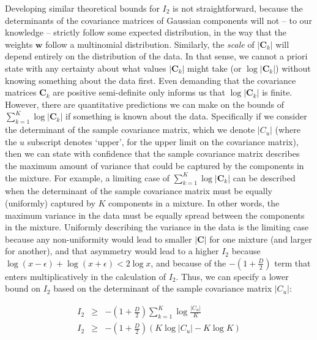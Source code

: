 \documentclass{elsarticle}
\newcommand{\vect}[1]{\boldsymbol{\mathbf{#1}}}
\def\cov{C}
\def\veccov{\vect{\cov}}
\def\weight{w}
\def\weights{\vect{\weight}}
\begin{document}
Developing similar theoretical bounds for $I_2$ is not straightforward, because
the determinants of the covariance matrices of Gaussian components will not
-- to our knowledge -- strictly follow some expected distribution, in the way 
that the weights $\weights$ follow a multinomial distribution. Similarly, the
\emph{scale} of $|\veccov_k|$ will depend entirely on the distribution of the
data. In that sense, we cannot a priori state with any certainty about what 
values $|\veccov_k|$ might take (or $\log{|\veccov_k|}$) without knowing
something about the data first. Even demanding that the covariance matrices
$\veccov_k$ are positive semi-definite only informs us that $\log{|\veccov_k|}$
is finite. However, there are quantitative predictions we can make on the 
bounds of $\sum_{k=1}^{K}\log{|\veccov_k|}$ if something is known about the
data. Specifically if we consider the determinant of the sample covariance 
matrix, which we denote $|\cov_{u}|$ (where the $u$ subscript denotes `upper',
for the upper limit on the covariance matrix), then we can state with confidence that
the sample covariance matrix describes the maximum amount of variance that 
could be captured by the components in the mixture. For example, a limiting
case of $\sum_{k=1}^{K}\log{|\veccov_k|}$ can be described when the determinant
of the sample covariance matrix must be equally (uniformly) captured by $K$ 
components in a mixture. In other words, the maximum variance in the data 
must be equally spread between the components in the mixture. Uniformly 
describing the variance in the data is the limiting case because any 
non-uniformity would lead to smaller $|\veccov|$ for one mixture (and larger 
for another), and that asymmetry would lead to a higher $I_2$ because 
$\log(x - \epsilon) + \log(x + \epsilon) < 2\log{x}$, and because of the 
$-(1 + \frac{D}{2})$ term that enters multiplicatively in the calculation of 
$I_2$. Thus, we can specify a lower bound on $I_2$ based on the determinant of
the sample covariance matrix $|\cov_{u}|$:

\begin{eqnarray}
    I_{2} & \geq & -\left(1 + \frac{D}{2}\right)\sum_{k=1}^{K}\log{\frac{|\cov_u|}{K}} \nonumber \\
    I_{2} & \geq & -\left(1 + \frac{D}{2}\right)\left(K\log{|\cov_u|} - K\log{K}\right) 
\end{eqnarray}
\end{document}
